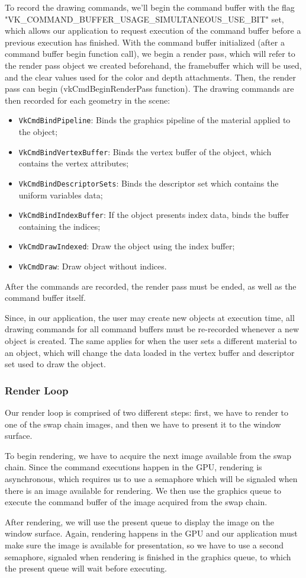 To record the drawing commands, we'll begin the command buffer with the flag "VK\_COMMAND\_BUFFER\_USAGE\_SIMULTANEOUS\_USE\_BIT" set, which allows our application to request execution of the command buffer before a previous execution has finished. With the command buffer initialized (after a command buffer begin function call), we begin a render pass, which will refer to the render pass object we created beforehand, the framebuffer which will be used, and the clear values used for the color and depth attachments. Then, the render pass can begin (vkCmdBeginRenderPass function). The drawing commands are then recorded for each geometry in the scene:

\begin{itemize}
    \item \texttt{VkCmdBindPipeline}: Binds the graphics pipeline of the material applied to the object;
    \item \texttt{VkCmdBindVertexBuffer}: Binds the vertex buffer of the object, which contains the vertex attributes;
    \item \texttt{VkCmdBindDescriptorSets}: Binds the descriptor set which contains the uniform variables data;
    \item \texttt{VkCmdBindIndexBuffer}: If the object presents index data, binds the buffer containing the indices;
    \item \texttt{VkCmdDrawIndexed}: Draw the object using the index buffer;
    \item \texttt{VkCmdDraw}: Draw object without indices.
\end{itemize}

After the commands are recorded, the render pass must be ended, as well as the command buffer itself.

Since, in our application, the user may create new objects at execution time, all drawing commands for all command buffers must be re-recorded whenever a new object is created. The same applies for when the user sets a different material to an object, which will change the data loaded in the vertex buffer and descriptor set used to draw the object.

\subsubsection{Render Loop}
Our render loop is comprised of two different steps: first, we have to render to one of the swap chain images, and then we have to present it to the window surface.

To begin rendering, we have to acquire the next image available from the swap chain. Since the command executions happen in the GPU, rendering is asynchronous, which requires us to use a semaphore which will be signaled when there is an image available for rendering. We then use the graphics queue to execute the command buffer of the image acquired from the swap chain.

After rendering, we will use the present queue to display the image on the window surface. Again, rendering happens in the GPU and our application must make sure the image is available for presentation, so we have to use a second semaphore, signaled when rendering is finished in the graphics queue, to which the present queue will wait before executing.
